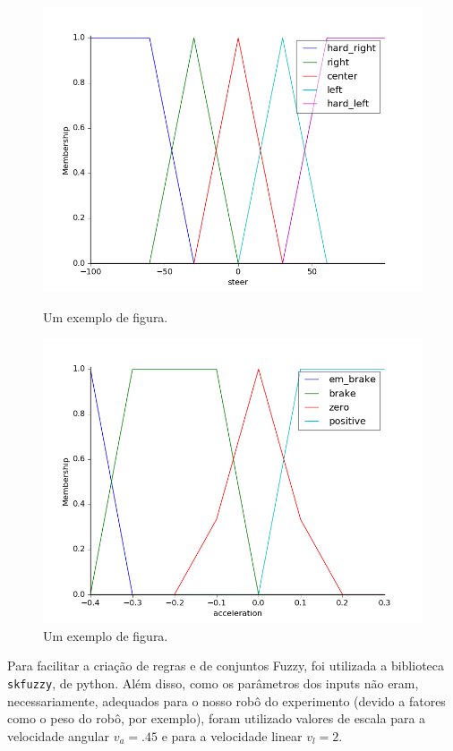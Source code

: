 \documentclass[twoside,conference,a4paper]{IEEEtran}
\begin{document}
\begin{figure}[]
  \includegraphics[width=1\hsize]{figuras/steer.png}
  \caption{Um exemplo de figura.}
  \label{fig:fig4}

  \includegraphics[width=1\hsize]{figuras/acc.png}
  \caption{Um exemplo de figura.}
  \label{fig:fig5}
\end{figure}

Para facilitar a criação de regras e de conjuntos Fuzzy, foi utilizada a biblioteca \texttt{skfuzzy}, de python. Além disso, como os parâmetros dos inputs não eram, necessariamente, adequados para o nosso robô do experimento (devido a fatores como o peso do robô, por exemplo), foram utilizado valores de escala para a velocidade angular $v_{a} = .45$ e para a velocidade linear $v_{l} = 2$. 
\end{document}
